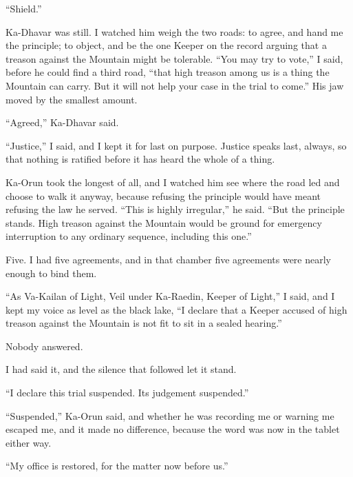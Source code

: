 ``Shield.''\par

Ka-Dhavar was still. I watched him weigh the two roads: to agree, and hand me the principle; to object, and be the one Keeper on the record arguing that a treason against the Mountain might be tolerable. ``You may try to vote,'' I said, before he could find a third road, ``that high treason among us is a thing the Mountain can carry. But it will not help your case in the trial to come.'' His jaw moved by the smallest amount.\par

``Agreed,'' Ka-Dhavar said.\par

``Justice,'' I said, and I kept it for last on purpose. Justice speaks last, always, so that nothing is ratified before it has heard the whole of a thing.\par

Ka-Orun took the longest of all, and I watched him see where the road led and choose to walk it anyway, because refusing the principle would have meant refusing the law he served. ``This is highly irregular,'' he said. ``But the principle stands. High treason against the Mountain would be ground for emergency interruption to any ordinary sequence, including this one.''\par
 
Five. I had five agreements, and in that chamber five agreements were nearly enough to bind them.\par
 
``As Va-Kailan of Light, Veil under Ka-Raedin, Keeper of Light,'' I said, and I kept my voice as level as the black lake, ``I declare that a Keeper accused of high treason against the Mountain is not fit to sit in a sealed hearing.''\par
 
Nobody answered.\par
 
I had said it, and the silence that followed let it stand. \par
 
``I declare this trial suspended. Its judgement suspended.''\par
 
``Suspended,'' Ka-Orun said, and whether he was recording me or warning me escaped me, and it made no difference, because the word was now in the tablet either way.\par
 
``My office is restored, for the matter now before us.''\par
 
